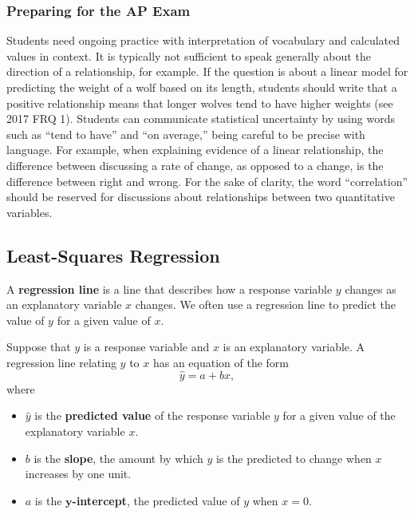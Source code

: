 \subsubsection{Preparing for the AP Exam}

Students need ongoing practice with interpretation of vocabulary and calculated values in context. It is typically not sufficient to speak generally about the direction of a relationship, for example. If the question is about a linear model for predicting the weight of a wolf based on its length, students should write that a positive relationship means that longer wolves tend to have higher weights (see 2017 FRQ 1). Students can communicate statistical uncertainty by using words such as ``tend to have'' and ``on average,'' being careful to be precise with language. For example, when explaining evidence of a linear relationship, the difference between discussing a rate of change, as opposed to a change, is the difference between right and wrong. For the sake of clarity, the word ``correlation'' should be reserved for discussions about relationships between two quantitative variables.

\subsection{Least-Squares Regression}

A \textbf{regression line} is a line that describes how a response variable $y$ changes as an explanatory variable $x$ changes. We often use a regression line to predict the value of $y$ for a given value of $x$.

Suppose that $y$ is a response variable and $x$ is an explanatory variable. A regression line relating $y$ to $x$ has an equation of the form
\[
    \hat{y} = a + bx,
\]
where
\begin{itemize}[itemsep=0pt]
\item $\hat{y}$ is the \textbf{predicted value} of the response variable $y$ for a given value of the explanatory variable $x$.
\item $b$ is the \textbf{slope}, the amount by which $y$ is the predicted to change when $x$ increases by one unit.
\item $a$ is the \textbf{$\mathbf{y}$-intercept}, the predicted value of $y$ when $x = 0$.
\end{itemize}

